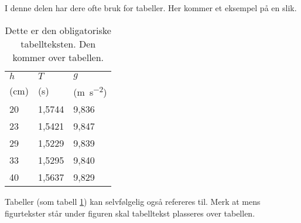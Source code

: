 \documentclass[5p]{elsarticle}	            	%
\begin{document}
I denne delen har dere ofte bruk for tabeller. Her kommer et eksempel på en slik.
%
%
\begin{table}[htb]
	\begin{center}
		\caption{Dette er den obligatoriske tabellteksten. Den kommer over tabellen.}
		\label{MinLilleTabell}	%
		\vspace{0.5cm}					%
		\begin{tabular}{lll} 		%
			\hline 								%
			$h$  &  $T$  & $g$  \\  			%
			(\si{\centi\metre}) &  (\si{\second}) & (\si{\metre\per\second\squared})\\ %
			\hline												
			20   &  1,5744 & 9,836 \\
			23   &  1,5421 & 9,847 \\
			29   &  1,5229 & 9,839 \\
			33   &  1,5295 & 9,840 \\
			40   &	1,5637 & 9,829 \\
			\hline
		\end{tabular}
	\end{center}
\end{table}


Tabeller (som tabell \ref{MinLilleTabell}) kan selvfølgelig også refereres til. Merk at mens figurtekster står under figuren skal tabelltekst plasseres 
over tabellen.
\end{document}

